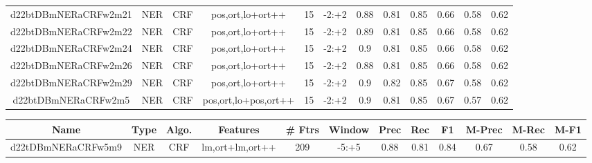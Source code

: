 \documentclass[a4paper]{article}
\begin{document}
\begin{landscape}
\begin{center}
\begin{tabular}{ |c|c|c|c|c|c|c|c|c|c|c|c|}
 	
 
 	
 		
 		\small{ d22btDBmNERaCRFw2m21 } & NER & CRF & pos,ort,lo+ort++  &  15 &  -2:+2  &  0.88 & 0.81 & 0.85  &  0.66 & 0.58 & 0.62 \\
 		

 	
 
 	
 		
 		\small{ d22btDBmNERaCRFw2m22 } & NER & CRF & pos,ort,lo+ort++  &  15 &  -2:+2  &  0.89 & 0.81 & 0.85  &  0.66 & 0.58 & 0.62 \\
 		

 	
 
 	
 		
 		\small{ d22btDBmNERaCRFw2m24 } & NER & CRF & pos,ort,lo+ort++  &  15 &  -2:+2  &  0.9 & 0.81 & 0.85  &  0.66 & 0.58 & 0.62 \\
 		

 	
 
 	
 		
 		\small{ d22btDBmNERaCRFw2m26 } & NER & CRF & pos,ort,lo+ort++  &  15 &  -2:+2  &  0.88 & 0.81 & 0.85  &  0.66 & 0.58 & 0.62 \\
 		

 	
 
 	
 		
 		\small{ d22btDBmNERaCRFw2m29 } & NER & CRF & pos,ort,lo+ort++  &  15 &  -2:+2  &  0.9 & 0.82 & 0.85  &  0.67 & 0.58 & 0.62 \\
 		

 	
 
 	
 		
 		\small{ d22btDBmNERaCRFw2m5 } & NER & CRF & pos,ort,lo+pos,ort++  &  15 &  -2:+2  &  0.9 & 0.81 & 0.85  &  0.67 & 0.57 & 0.62 \\
 		
 \hline
\end{tabular}
\end{center}




\begin{center}
\begin{tabular}{ |c|c|c|c|c|c|c|c|c|c|c|c|} 
 \hline
 	Name & Type & Algo. & Features & \# Ftrs & Window & Prec & Rec & F1 & M-Prec & M-Rec & M-F1\\
 \hline

 		

 	
 
 	
 		
 		\small{ d22tDBmNERaCRFw5m9 } & NER & CRF & lm,ort+lm,ort++  &  209 &  -5:+5  &  0.88 & 0.81 & 0.84  &  0.67 & 0.58 & 0.62 \\
 		


\end{tabular}
\end{center}
\end{landscape}
\end{document}
